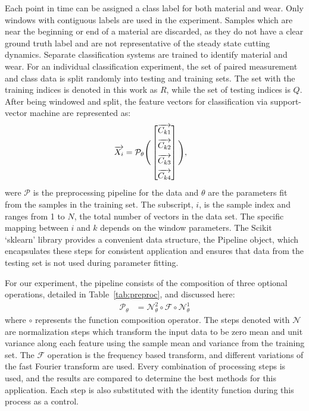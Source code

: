 Each point in time can be assigned a class label for both material and wear. 
Only windows with contiguous labels are used in the experiment. 
Samples which are near the beginning or end of a material are discarded, 
 as they do not have a clear ground truth label and are not representative of the
 steady state cutting dynamics.
Separate classification systems are trained to identify material and wear.
For an individual classification experiment, the set of paired measurement and class data
 is split randomly into testing and training sets.
The set with the training indices is denoted in this work as $R$, while the set of testing indices is $Q$.
After being windowed and split, the feature vectors for classification via 
 support-vector machine are represented as:
\begin{align}
\overrightarrow{X_i} &= \mathcal{P}_{\theta} \Bigg( \begin{bmatrix}  \overrightarrow{C_{k1}} \\[1ex]
                              \overrightarrow{C_{k2}} \\[1ex]
                              \overrightarrow{C_{k3}} \\[1ex]
                              \overrightarrow{C_{k4}} \end{bmatrix} \Bigg) ,
\end{align}
were $\mathcal{P}$ is the preprocessing pipeline for the data and $\theta$ are the parameters fit from the
 samples in the training set.
The subscript, $i$, is the sample index and ranges from 1 to $N$, the total number of vectors
 in the data set. The specific mapping between $i$ and $k$ depends on the window parameters.
The Scikit `sklearn' library \cite{chang11, platt99} provides a convenient data structure, the Pipeline object, 
 which encapsulates these steps for consistent application and ensures that data from the 
 testing set is not used during parameter fitting. 

For our experiment, the pipeline consists of the composition of three optional operations, 
 detailed in Table~\ref{tab:preproc}, and discussed here:
\begin{align}
\mathcal{P}_\theta &= \mathcal{N}_\theta^2 \circ \mathcal{F} \circ \mathcal{N}_\theta^1
\end{align}
where $\circ$ represents the function composition operator.
The steps denoted with $\mathcal{N}$ are normalization steps which transform the input
 data to be zero mean and unit variance along each feature using the sample mean and variance
 from the training set. 
The $\mathcal{F}$ operation is the frequency based transform, and different variations of 
 the fast Fourier transform are used. 
Every combination of processing steps is used, 
 and the results are compared to determine the best methods for this application. 
Each step is also substituted with the identity function during this process as a control.

